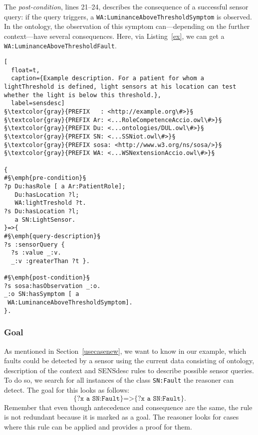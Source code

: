 The \emph{post-condition}, lines 21--24, describes the consequence of a successful sensor query: if the query triggers, a  
\texttt{WA:LuminanceAboveThresholdSymptom} is observed.
In the ontology, the observation of this symptom can---depending on the further context---have several consequences. 
Here, via Listing~\ref{ex}, we can get a \texttt{WA:LuminanceAboveThresholdFault}.

\begin{lstlisting}[
  float=t,
  caption={Example description. For a patient for whom a lightThreshold is defined, light sensors at his location can test whether the light is below this threshold.},
  label=sensdesc]
§\textcolor{gray}{PREFIX   : <http://example.org\#>}§ 
§\textcolor{gray}{PREFIX Ar: <...RoleCompetenceAccio.owl\#>}§
§\textcolor{gray}{PREFIX Du: <...ontologies/DUL.owl\#>}§
§\textcolor{gray}{PREFIX SN: <...SSNiot.owl\#>}§
§\textcolor{gray}{PREFIX sosa: <http://www.w3.org/ns/sosa/>}§
§\textcolor{gray}{PREFIX WA: <...WSNextensionAccio.owl\#>}§

{
#§\emph{pre-condition}§
?p Du:hasRole [ a Ar:PatientRole];
   Du:hasLocation ?l;
   WA:lightTreshold ?t.
?s Du:hasLocation ?l;
   a SN:LightSensor.
}=>{
#§\emph{query-description}§
?s :sensorQuery { 
  ?s :value _:v. 
  _:v :greaterThan ?t }.

#§\emph{post-condition}§
?s sosa:hasObservation _:o.
_:o SN:hasSymptom [ a 
 WA:LuminanceAboveThresholdSymptom].
}.
\end{lstlisting}


\subsubsection{Goal}
As mentioned in Section~\ref{usecasenew}, we want to know in our example, which 
faults could be detected by a sensor using the current data consisting of ontology, description of the context and SENSdesc rules to describe possible sensor queries. 
To do so, we search for all instances of the class \texttt{SN:Fault} the reasoner can detect. 
The goal for this looks as follows:
\begin{equation}\label{goal}
 \texttt{\{?x a SN:Fault\}=>\{?x a SN:Fault\}.}
\end{equation}
Remember that even though antecedence and consequence are the same, the rule 
is not redundant because it is marked
as a goal. The reasoner looks for cases where this rule can be applied and provides a proof for them.

